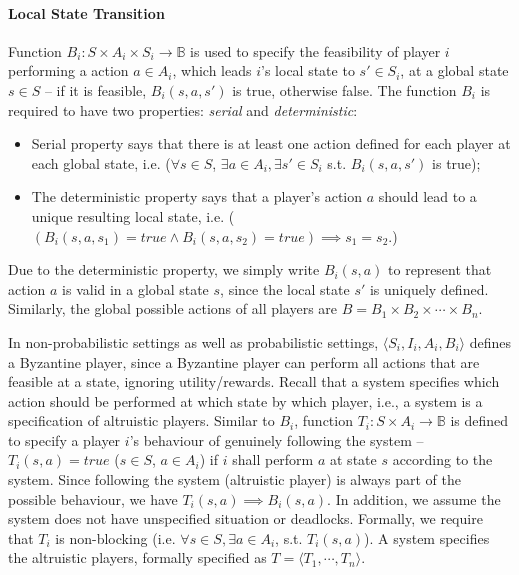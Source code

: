 \paragraph{Local State Transition}
Function $B_i: S\times A_i\times S_i \rightarrow \mathbb{B}$ is used to specify the feasibility of player $i$ performing a action $a\in A_i$, which leads $i$'s local state to $s'\in S_i$, at a global state $s\in S$  -- if it is feasible, $B_i(s,a,s')$ is true, otherwise false.
The function $B_i$ is required to have two properties: \emph{serial} and \emph{deterministic}:
\begin{itemize}
	\item
	Serial property says that there is at least one action defined for each player at each global state, i.e.
	($\forall s \in S$, $\exists a \in A_i , \exists s' \in S_i$ s.t. $B_i(s,a,s')$ is true);
	\item
	The deterministic property says that a player's action $a$ should lead to a unique resulting local state, i.e. ($(B_i(s,a,s_1)=true \wedge B_i(s,a,s_2 )=true) \implies s_1 =s_2$.)
\end{itemize}
Due to the deterministic property,  we simply write $B_i(s,a)$ to represent that action $a$ is valid in a global state $s$, since the local state $s'$ is uniquely defined. Similarly, the global possible actions of all players are $B = B_1\times B_2\times\cdots\times B_n$.


In non-probabilistic settings as well as probabilistic settings,
$\langle S_i, I_i, A_i, B_i\rangle$ defines a Byzantine player, since a Byzantine player can perform all actions that are feasible at a state, ignoring utility/rewards.
%
Recall that a system specifies which action should be performed at which state by which player, i.e., a system is a specification of altruistic players.
Similar to $B_i$, function $T_i : S \times A_i \rightarrow \mathbb{B}$ is defined to specify a player $i$'s behaviour of genuinely following the system -- $T_i (s, a)=true$ ($s\in S$, $a\in A_i$) if $i$ shall perform $a$ at state $s$ according to the system.
Since following the system (altruistic player) is always part of the possible behaviour, we have $T_i (s,a) \implies B_i (s,a)$. In addition, we assume the system does not have unspecified situation or deadlocks. Formally, we require that $T_i$ is non-blocking (i.e. $\forall s \in S,  \exists a \in A_i$, s.t. $T_i(s,a)$).
A system specifies the altruistic players, formally specified as $T=\langle T_1, \cdots, T_n\rangle$.%


